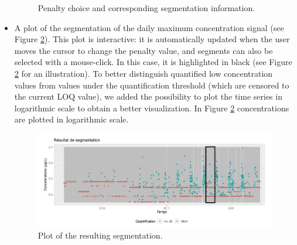 \begin{itemize}
\begin{figure}[htbp]
  \caption{Penalty choice and corresponding segmentation information.}
  \label{fig:Imapp3}
\end{figure}
\item A plot of the segmentation of the daily maximum concentration signal (see Figure \ref{fig:Imapp4}). This plot is interactive: it is automatically updated when the user moves the cursor to change the penalty value, and segments can also be selected with a mouse-click. In this case, it is highlighted in black (see Figure \ref{fig:Imapp4} for an illustration). To better distinguish quantified low concentration values from values under the quantification threshold (which are censored to the current LOQ value), we added the possibility to plot the time series in logarithmic scale to obtain a better visualization. In Figure \ref{fig:Imapp4} concentrations are plotted in logarithmic scale.
\begin{figure}[htbp]
  \centering
  \includegraphics[]{figs/Chap6/Im_appbis4.pdf}
  \caption{Plot of the resulting segmentation.}
  \label{fig:Imapp4}
\end{figure}     
\end{itemize}  

